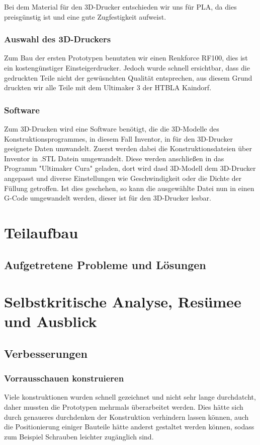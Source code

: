 Bei dem Material für den 3D-Drucker entschieden wir uns für PLA, da dies preisgünstig ist und eine gute Zugfestigkeit aufweist.

\subsubsection{Auswahl des 3D-Druckers}
Zum Bau der ersten Prototypen benutzten wir einen Renkforce RF100, dies ist ein kostengünstiger Einsteigerdrucker.
Jedoch wurde schnell ersichtbar, dass die gedruckten Teile nicht der gewüsnchten Qualität entsprechen, aus diesem Grund
druckten wir alle Teile mit dem Ultimaker 3 der HTBLA Kaindorf.

\subsubsection{Software}
Zum 3D-Drucken wird eine Software benötigt, die die 3D-Modelle des Konstruktionsprogrammes, in diesem Fall Inventor,
in für den 3D-Drucker geeignete Daten umwandelt.
Zuerst werden dabei die Konstruktionsdateien über Inventor in .STL Datein umgewandelt. Diese werden anschließen in das
Programm "Ultimaker Cura" geladen, dort wird dasd 3D-Modell dem 3D-Drucker angepasst und diverse Einstellungen wie
Geschwindigkeit oder die Dichte der Füllung getroffen. Ist dies geschehen, so kann die ausgewählte Datei nun in einen
G-Code umgewandelt werden, dieser ist für den 3D-Drucker lesbar.

\section{Teilaufbau}
\subsection{Aufgetretene Probleme und Lösungen}

\section{Selbstkritische Analyse, Resümee und Ausblick}
\subsection{Verbesserungen}
\subsubsection{Vorrausschauen konstruieren}
Viele konstruktionen wurden schnell gezeichnet und nicht sehr lange durchdatcht, daher mussten die Prototypen mehrmals überarbeitet werden.
Dies hätte sich durch genaueres durchdenken der Konstruktion verhindern lassen können, auch die Positionierung
einiger Bauteile hätte anderst gestaltet werden können, sodass zum Beispiel Schrauben leichter zugänglich sind.


